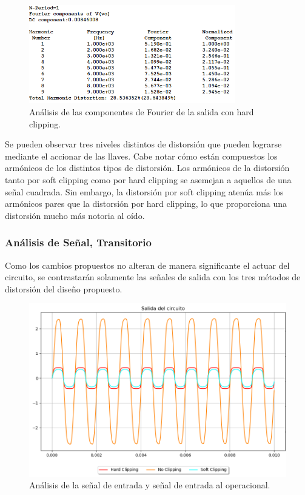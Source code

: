      \begin{figure}[H]
         \centering
         \includegraphics[width=0.8\textwidth, trim={0 0 0 0}, clip]{Ejercicio5/Imagenes/Circuito_base/Sim/circuito_propuesto_fourier_hard.png}
         \caption{Análisis de las componentes de Fourier de la salida con hard clipping.}
         \label{fig:four_hard}
     \end{figure}

Se pueden observar tres niveles distintos de distorsión que pueden lograrse mediante el accionar de las llaves. Cabe notar cómo están compuestos los armónicos de los distintos tipos de distorsión. Los armónicos de la distorsión tanto por soft clipping como por hard clipping se asemejan a aquellos de una señal cuadrada. Sin embargo, la distorsión por soft clipping atenúa más los armónicos pares que la distorsión por hard clipping, lo que proporciona una distorsión mucho más notoria al oído.
	
\subsubsection{Análisis de Señal, Transitorio}

Como los cambios propuestos no alteran de manera significante el actuar del circuito, se contrastarán solamente las señales de salida con los tres métodos de distorsión del diseño propuesto.

\begin{figure}[H]
	\centering
	\includegraphics[width=1\textwidth, trim={0 0 0 0}, clip]{Ejercicio5/Imagenes/Circuito_base/Sim/circuito_propuesto_salidas.png}
	\caption{Análisis de la señal de entrada y señal de entrada al operacional.}
	\label{fig:sim_prop_tran}
\end{figure}

